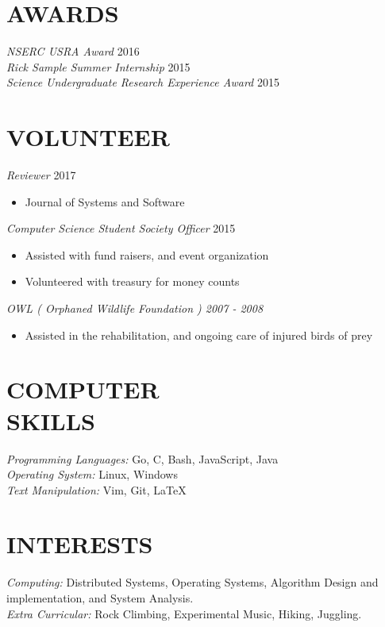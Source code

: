 \documentclass[line,margin]{res}
\begin{document}
\begin{resume}
\section{AWARDS}
{\sl NSERC USRA Award} \hfill 2016\\
{\sl Rick Sample Summer Internship} \hfill 2015\\
{\sl Science Undergraduate Research Experience Award} \hfill 2015\\


\section{VOLUNTEER}

{\sl Reviewer} \hfill 2017
    \begin{itemize}
        \item Journal of Systems and Software
    \end{itemize}

{\sl Computer Science Student Society Officer} \hfill 2015
    \begin{itemize}
        \item Assisted with fund raisers, and event organization
        \item Volunteered with treasury for money counts
    \end{itemize}

{\sl OWL ( Orphaned Wildlife Foundation ) {\hfill 2007 - 2008}
    \begin{itemize}
         \item Assisted in the rehabilitation, and ongoing care of injured birds of prey
    \end{itemize}
}
    

\section{COMPUTER \\ SKILLS} 
	{\sl Programming Languages:} Go, C, Bash, JavaScript, Java\\
	{\sl Operating System:} Linux, Windows\\
	{\sl Text Manipulation:} Vim, Git, \LaTeX \\

\section{INTERESTS}
	{\sl Computing:}  Distributed Systems, Operating Systems, Algorithm Design and implementation, and System Analysis.\\
	{\sl Extra Curricular:} Rock Climbing, Experimental Music, Hiking, Juggling.\\

\end{resume}
\end{document}
